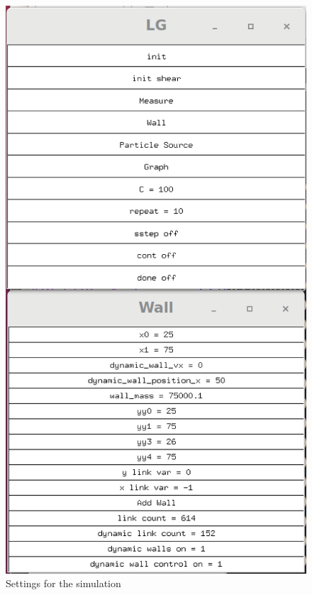 \documentclass{article}
\begin{document}
\begin{figure}[H]
\includegraphics[scale=0.2]{A1_p0.png}
\caption{\label{fig} Settings for the simulation}
\end{figure}
\end{document}
